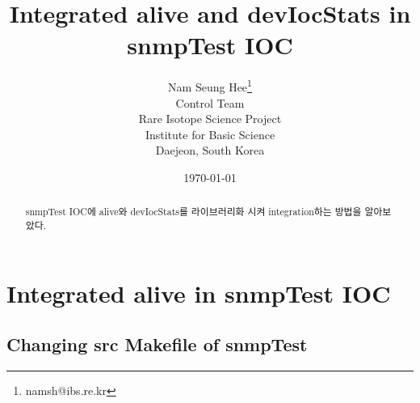 \documentclass[11pt
  , a4paper
  , article
  , oneside
]{memoir}
\begin{document}
\newcommand{\technumber}{
  RAON Control-Document Series\\
  Revision : v0.1,   Release : 2015.05.06}
\title{\textbf{Integrated alive and devIocStats in snmpTest IOC \\}}


\author{Nam Seung Hee\thanks{namsh@ibs.re.kr} \\
  Control Team \\
  Rare Isotope Science Project\\
  Institute for Basic Science\\
  Daejeon, South Korea
}

\date{\today}

\renewcommand{\maketitlehooka}{\begin{flushright}\textsf{\technumber}\end{flushright}}

\maketitle

\begin{abstract}
snmpTest IOC에 alive와 devIocStats를 라이브러리화 시켜 integration하는 방법을 알아보았다. 
\end{abstract}



\chapter{Integrated alive in snmpTest IOC}

\section{Changing src Makefile of snmpTest}
\end{document}
